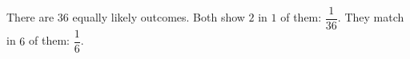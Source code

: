 There are $36$ equally likely outcomes. Both show $2$ in $1$ of them: $\boxed{\dfrac1{36}}$. They match in $6$ of them: $\boxed{\dfrac16}$.

